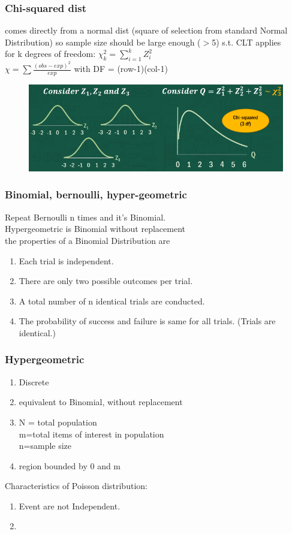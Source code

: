 \documentclass{beamer}
\begin{document}
\begin{frame}\frametitle{Chi-squared dist}
	comes directly from a normal dist (square of selection from standard Normal Distribution) so sample size should be large enough ($>$5) s.t. CLT applies\\
	for k degrees of freedom: $\chi_k^2 = \sum_{i=1}^{k}Z_i^2$\\
	$\chi = \sum\frac{(obs-exp)^2}{exp}$ with
	DF = (row-1)(col-1)\\
	\begin{figure}
		\includegraphics[scale=0.5]{chisq}
	\end{figure}
\end{frame}



\begin{frame}\frametitle{Binomial, bernoulli, hyper-geometric}
	Repeat Bernoulli n times and it's Binomial.\\
	Hypergeometric is Binomial without replacement\\

	the properties of a Binomial Distribution are
	\begin{enumerate}
		\item Each trial is independent.
		\item There are only two possible outcomes per trial.
		\item A total number of n identical trials are conducted.
		\item The probability of success and failure is same for all trials. (Trials are identical.)
	\end{enumerate}

\end{frame}


\begin{frame}\frametitle{Hypergeometric}
\begin{enumerate}
	\item Discrete
	\item equivalent to Binomial, without replacement
	\item N = total population\\ m=total items of interest in population\\n=sample size
	\item region bounded by 0 and m
\end{enumerate}
Characteristics of Poisson distribution:
\begin{enumerate}
	\item Event are not Independent.
	\item 
\end{enumerate}	

\end{frame}
\end{document}
